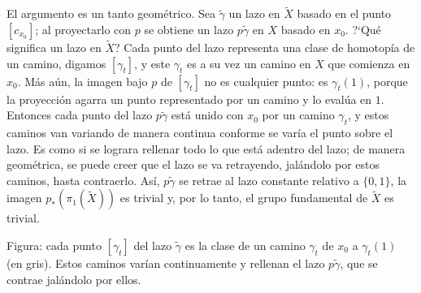 \documentclass[11pt]{article}
\begin{document}
El argumento es un tanto geométrico. Sea $\tilde\gamma$ un lazo en $\tilde X$ basado en el punto $[c_{x_0}]$; al proyectarlo con $p$ se obtiene un lazo $p\tilde\gamma$ en $X$ basado en $x_0$. ?`Qué significa un lazo en $\tilde X$? Cada punto del lazo representa una clase de homotopía de un camino, digamos $[\gamma_t]$, y este $\gamma_t$ es a su vez un camino en $X$ que comienza en $x_0$. Más aún, la imagen bajo $p$ de $[\gamma_t]$ no es cualquier punto: es $\gamma_t(1)$, porque la proyección agarra un punto representado por un camino y lo evalúa en $1$. Entonces cada punto del lazo $p\tilde\gamma$ está unido con $x_0$ por un camino $\gamma_t$, y estos caminos van variando de manera continua conforme se varía el punto sobre el lazo. Es como si se lograra rellenar todo lo que está adentro del lazo; de manera geométrica, se puede creer que el lazo se va retrayendo, jalándolo por estos caminos, hasta contraerlo. Así, $p\tilde\gamma$ se retrae al lazo constante relativo a $\{0,1\}$, la imagen $p_*(\pi_1(\tilde X))$ es trivial y, por lo tanto, el grupo fundamental de $\tilde X$ es trivial.

\begin{center}
\end{center}

\noindent Figura: cada punto $[\gamma_t]$ del lazo $\tilde\gamma$ es la clase de un camino $\gamma_t$ de $x_0$ a $\gamma_t(1)$ (en gris). Estos caminos varían continuamente y rellenan el lazo $p\tilde\gamma$, que se contrae jalándolo por ellos.
\end{document}
